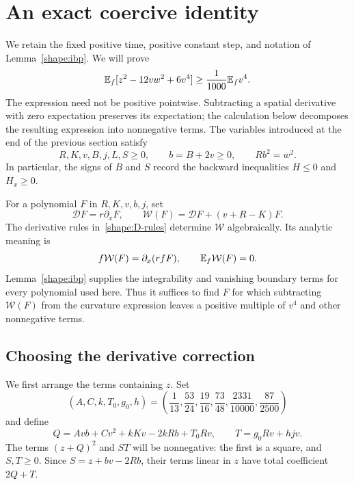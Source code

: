 \section{An exact coercive identity}\label{cert:section}

We retain the fixed positive time, positive constant step, and notation of
Lemma~\ref{shape:ibp}.  We will prove
\[
 \mathbb E_f[z^2-12vw^2+6v^4]\geq\frac1{1000}\mathbb E_fv^4.
\]
The expression need not be positive pointwise.  Subtracting a spatial
derivative with zero expectation preserves its expectation; the calculation
below decomposes the resulting expression into nonnegative terms.  The variables introduced at the end of the
previous section satisfy
\begin{equation}\label{cert:signs}
 R,K,v,B,j,L,S\geq0,\qquad b=B+2v\geq0,
 \qquad Rb^2=w^2.
\end{equation}
In particular, the signs of $B$ and $S$ record the backward inequalities
$H\leq0$ and $H_x\geq0$.

For a polynomial $F$ in $R,K,v,b,j$, set
\begin{equation}\label{cert:operators}
 \mathcal D F=r\partial_xF,\qquad
 \mathcal W(F)=\mathcal DF+(v+R-K)F.
\end{equation}
The derivative rules in~\eqref{shape:D-rules} determine $\mathcal W$
algebraically.  Its analytic meaning is
\begin{equation}\label{cert:divergence}
 f\mathcal W(F)=\partial_x(rfF),\qquad
 \mathbb E_f\mathcal W(F)=0.
\end{equation}
Lemma~\ref{shape:ibp} supplies the integrability and vanishing boundary
terms for every polynomial used here.  Thus it suffices to find $F$ for
which subtracting $\mathcal W(F)$ from the curvature expression leaves a
positive multiple of $v^4$ and other nonnegative terms.

\subsection{Choosing the derivative correction}

We first arrange the terms containing $z$.  Set
\begin{equation}\label{cert:constants-first}
 (A,C,k,T_0,g_0,h)
 =\left(\frac1{13},\frac{53}{24},\frac{19}{16},\frac{73}{48},
         \frac{2331}{10000},\frac{87}{2500}\right)
\end{equation}
and define
\begin{equation}\label{cert:QT}
 Q=Avb+Cv^2+kKv-2kRb+T_0Rv,
 \qquad T=g_0Rv+hjv.
\end{equation}
The terms $(z+Q)^2$ and $ST$ will be nonnegative: the first is a square,
and $S,T\geq0$.  Since $S=z+bv-2Rb$, their terms linear in $z$ have
total coefficient $2Q+T$.

